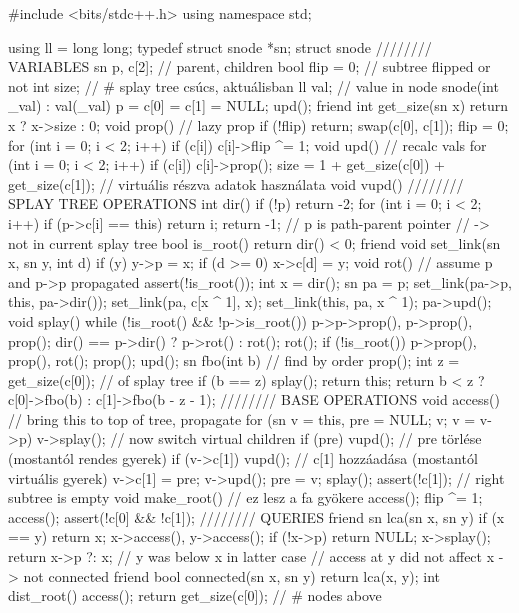 #include <bits/stdc++.h>
using namespace std;

using ll = long long;
typedef struct snode *sn;
struct snode {         //////// VARIABLES
	sn p, c[2];        // parent, children
	bool flip = 0;     // subtree flipped or not
	int size;          // # splay tree csúcs, aktuálisban
	ll val;            // value in node
	snode(int _val) : val(_val) { p = c[0] = c[1] = NULL; upd(); }
	friend int get_size(sn x) { return x ? x->size : 0; }
	void prop() {  // lazy prop
		if (!flip) return;
		swap(c[0], c[1]);
		flip = 0;
		for (int i = 0; i < 2; i++)
			if (c[i]) c[i]->flip ^= 1;
	}
	void upd() {  // recalc vals
		for (int i = 0; i < 2; i++) if (c[i]) c[i]->prop();
		size = 1 + get_size(c[0]) + get_size(c[1]);
		// virtuális részva adatok használata
	}
	void vupd(){}
	//////// SPLAY TREE OPERATIONS
	int dir() {
		if (!p) return -2;
		for (int i = 0; i < 2; i++) if (p->c[i] == this) return i;
		return -1;  // p is path-parent pointer
	}  // -> not in current splay tree
	bool is_root() { return dir() < 0; }
	friend void set_link(sn x, sn y, int d) { if (y) y->p = x; if (d >= 0) x->c[d] = y; }
	void rot() {  // assume p and p->p propagated
		assert(!is_root());
		int x = dir(); sn pa = p;
		set_link(pa->p, this, pa->dir()); set_link(pa, c[x ^ 1], x); set_link(this, pa, x ^ 1);
		pa->upd();
	}
	void splay() {
		while (!is_root() && !p->is_root()) {
			p->p->prop(), p->prop(), prop();
			dir() == p->dir() ? p->rot() : rot(); rot();
		}
		if (!is_root()) p->prop(), prop(), rot();
		prop(); upd();
	}
	sn fbo(int b) {  // find by order
		prop(); int z = get_size(c[0]);  // of splay tree
		if (b == z) { splay(); return this; }
		return b < z ? c[0]->fbo(b) : c[1]->fbo(b - z - 1);
	}
	//////// BASE OPERATIONS
	void access() {  // bring this to top of tree, propagate
		for (sn v = this, pre = NULL; v; v = v->p) {
			v->splay();  // now switch virtual children
			if (pre) vupd(); // pre törlése (mostantól rendes gyerek)
			if (v->c[1]) vupd(); // c[1] hozzáadása (mostantól virtuális gyerek)
			v->c[1] = pre; v->upd(); pre = v;
		}
		splay();
		assert(!c[1]);  // right subtree is empty
	}
	void make_root() { // ez lesz a fa gyökere
		access(); flip ^= 1; access();
		assert(!c[0] && !c[1]);
	}
	//////// QUERIES
	friend sn lca(sn x, sn y) {
		if (x == y) return x;
		x->access(), y->access();
		if (!x->p) return NULL;
		x->splay();
		return x->p ?: x;  // y was below x in latter case
	}  // access at y did not affect x -> not connected
	friend bool connected(sn x, sn y) { return lca(x, y); }
	int dist_root() { access(); return get_size(c[0]); } // # nodes above
}
